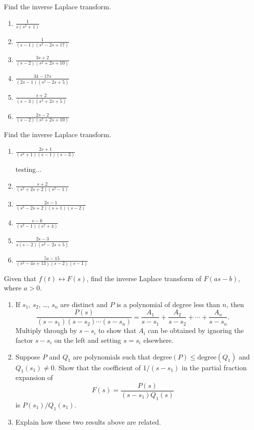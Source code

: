 \documentclass{ximera}
\begin{document}
\begin{problem}\label{exer:8.2.7}
Find the inverse Laplace transform.

\begin{enumerate}
    \item $\frac{1}{s(s^2+1)}$
    \item $\frac{1}{(s-1)(s^2-2s+17)}$
    \item $\frac{3s+2}{(s-2)(s^2+2s+10)}$
    \item $\frac{34-17s}{(2s-1)(s^2-2s+5)}$
    \item $\frac{s+2}{(s-3)(s^2+2s+5)}$
    \item $\frac{2s-2}{(s-2)(s^2+2s+10)}$
\end{enumerate}
\end{problem}

\begin{problem}\label{exer:8.2.8}
 Find the inverse Laplace transform.
\begin{enumerate}
\item $\frac{2s+1}{(s^2+1)(s-1)(s-3)}$

\begin{solution}
testing...
\end{solution}

\item $\frac{s+2}{(s^2+2s+2)(s^2-1)}$



\item $\frac{2s-1}{(s^2-2s+2)(s+1)(s-2)}$



    \item $\frac{s-6}{(s^2-1)(s^2+4)}$
    \item $\frac{2s-3}{s(s-2)(s^2-2s+5)}$
    \item $\frac{5s-15}{(s^2-4s+13)(s-2)(s-1)}$
\end{enumerate}
\end{problem}

\begin{problem}\label{exer:8.2.9}
 Given that $f(t)\leftrightarrow F(s)$, find the inverse
Laplace transform of $F(as-b)$, where $a>0$.
\end{problem}

\begin{problem}\label{exer:8.2.10}
\begin{enumerate}
\item  %
If $s_1$, $s_2$, \dots, $s_n$ are distinct and $P$ is a polynomial of
degree less than $n$, then
$$
\frac{P(s)}{(s-s_1)(s-s_2)\cdots(s-s_n)}=
\frac{A_1}{s-s_1}+\frac{A_2}{s-s_2}+\cdots+\frac{A_n}{s-s_n}.
$$
Multiply through by $s-s_i$ to show that
 $A_i$ can be obtained by ignoring the factor $s-s_i$ on the
left and setting $s=s_i$ elsewhere.
\item %
Suppose $P$ and $Q_1$ are polynomials such that
$\text{degree}(P)\le\text{degree}(Q_1)$ and $Q_1(s_1)\ne0$.
Show that the coefficient of $1/(s-s_1)$ in the partial fraction
expansion of
$$
F(s)=\frac{P(s)}{(s-s_1)Q_1(s)}
$$
is $P(s_1)/Q_1(s_1)$.
\item %
Explain how these two results above are related.
\end{enumerate}
\end{problem}
\end{document}

